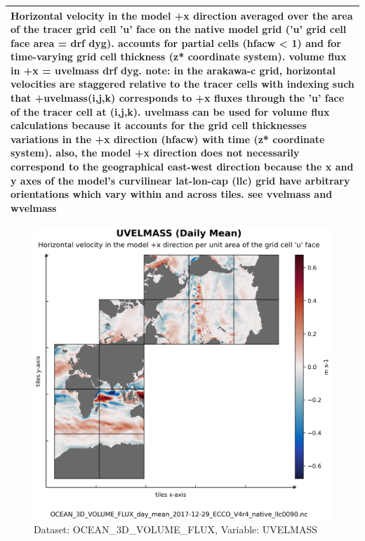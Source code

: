 \begin{longtable}{|m{}|m{}|m{}|m{}|}
\multicolumn{4}{|p{1\textwidth}|}{Horizontal velocity in the model +x direction averaged over the area of the tracer grid cell 'u' face on the native model grid ('u' grid cell face area = drf dyg). accounts for partial cells (hfacw < 1) and for time-varying grid cell thickness (z* coordinate system). volume flux in +x = uvelmass drf dyg. note: in the arakawa-c grid, horizontal velocities are staggered relative to the tracer cells with indexing such that +uvelmass(i,j,k) corresponds to +x fluxes through the 'u' face of the tracer cell at (i,j,k). uvelmass can be used for volume flux calculations because it accounts for the grid cell thicknesses variations in the +x direction (hfacw) with time (z* coordinate system). also, the model +x direction does not necessarily correspond to the geographical east-west direction because the x and y axes of the model's curvilinear lat-lon-cap (llc) grid have arbitrary orientations which vary within and across tiles. see vvelmass and wvelmass} \\ \hline
\end{longtable}

\begin{figure}[H]
\centering
\includegraphics[scale=0.55]{../images/plots/native_plots/Ocean_Three-Dimensional_Volume_Fluxes/UVELMASS.png}
\caption{Dataset: OCEAN\_3D\_VOLUME\_FLUX, Variable: UVELMASS}
\label{tab:table-OCEAN_3D_VOLUME_FLUX_UVELMASS-Plot}
\end{figure}
\pagebreak
